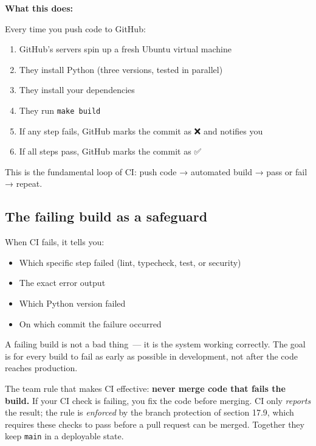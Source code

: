 \noindent{}\textbf{What this does:}

Every time you push code to GitHub:

\begin{enumerate}
\def\labelenumi{\arabic{enumi}.}
\tightlist
\item
  GitHub's servers spin up a fresh Ubuntu virtual machine
\item
  They install Python (three versions, tested in parallel)
\item
  They install your dependencies
\item
  They run \texttt{make\ build}
\item
  If any step fails, GitHub marks the commit as ❌ and notifies you
\item
  If all steps pass, GitHub marks the commit as ✅
\end{enumerate}

\noindent{}This is the fundamental loop of CI: push code → automated build → pass or fail → repeat.

\subsection*{The failing build as a safeguard}\label{17-build-process:the-failing-build-as-a-safeguard}

When CI fails, it tells you:

\begin{itemize}
\tightlist
\item
  Which specific step failed (lint, typecheck, test, or security)
\item
  The exact error output
\item
  Which Python version failed
\item
  On which commit the failure occurred
\end{itemize}

\noindent{}A failing build is not a bad thing~--- it is the system working correctly. The goal is for every build to fail as early as possible in development, not after the code reaches production.

The team rule that makes CI effective: \textbf{never merge code that fails the build.} If your CI check is failing, you fix the code before merging. CI only \emph{reports} the result; the rule is \emph{enforced} by the branch protection of section 17.9, which requires these checks to pass before a pull request can be merged. Together they keep \texttt{main} in a deployable state.

